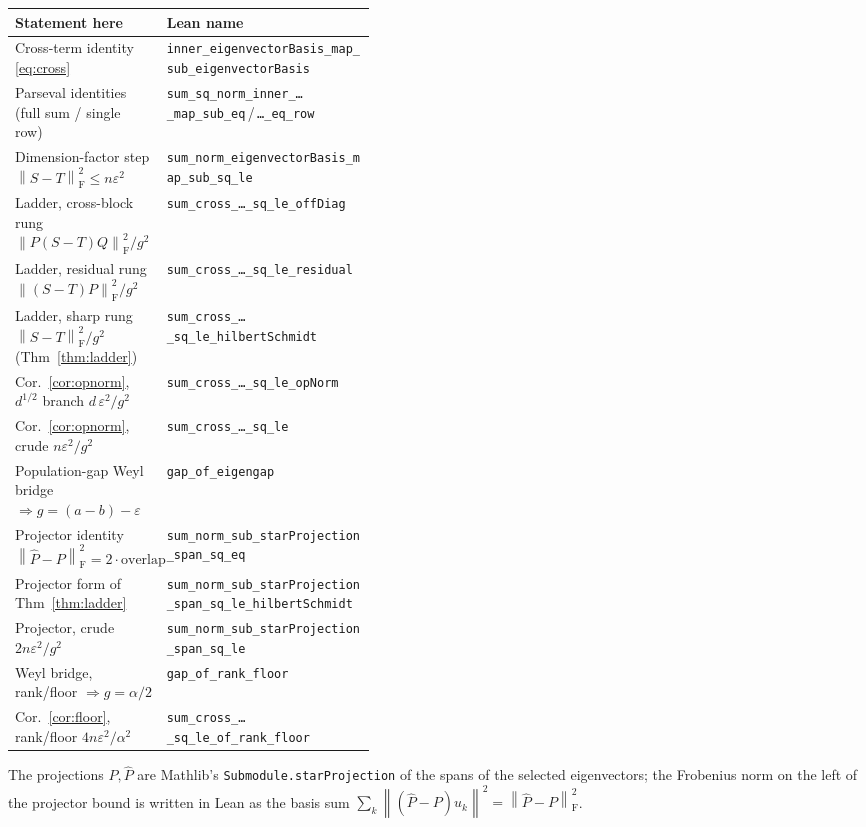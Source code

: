 \documentclass[11pt]{article}
\newcommand{\norm}[1]{\left\lVert #1\right\rVert}
\newcommand{\eps}{\varepsilon}
\newcommand{\F}{\mathrm{F}}
\newcommand{\gap}{g}
\theoremstyle{remark}
\begin{document}
\begin{center}
\footnotesize
\setlength{\tabcolsep}{4pt}
\begin{tabular}{@{}p{0.42\linewidth}l@{}}
\toprule
Statement here & Lean name \\
\midrule
Cross-term identity \eqref{eq:cross}
  & \texttt{inner\_eigenvectorBasis\_map\_sub\_eigenvectorBasis} \\
Parseval identities (full sum / single row)
  & \texttt{sum\_sq\_norm\_inner\_\dots\_map\_sub\_eq}\,/\,\texttt{\dots\_eq\_row} \\
Dimension-factor step $\norm{S-T}_{\F}^2\le n\eps^2$
  & \texttt{sum\_norm\_eigenvectorBasis\_map\_sub\_sq\_le} \\
Ladder, cross-block rung $\norm{P(S-T)Q}_{\F}^2/\gap^2$
  & \texttt{sum\_cross\_\dots\_sq\_le\_offDiag} \\
Ladder, residual rung $\norm{(S-T)P}_{\F}^2/\gap^2$
  & \texttt{sum\_cross\_\dots\_sq\_le\_residual} \\
Ladder, sharp rung $\norm{S-T}_{\F}^2/\gap^2$ (Thm~\ref{thm:ladder})
  & \texttt{sum\_cross\_\dots\_sq\_le\_hilbertSchmidt} \\
Cor.~\ref{cor:opnorm}, $d^{1/2}$ branch $d\,\eps^2/\gap^2$
  & \texttt{sum\_cross\_\dots\_sq\_le\_opNorm} \\
Cor.~\ref{cor:opnorm}, crude $n\eps^2/\gap^2$
  & \texttt{sum\_cross\_\dots\_sq\_le} \\
Population-gap Weyl bridge $\Rightarrow\gap=(a-b)-\eps$
  & \texttt{gap\_of\_eigengap} \\
Projector identity $\norm{\widehat P-P}_{\F}^2=2\cdot\text{overlap}$
  & \texttt{sum\_norm\_sub\_starProjection\_span\_sq\_eq} \\
Projector form of Thm~\ref{thm:ladder}
  & \texttt{sum\_norm\_sub\_starProjection\_span\_sq\_le\_hilbertSchmidt} \\
Projector, crude $2n\eps^2/\gap^2$
  & \texttt{sum\_norm\_sub\_starProjection\_span\_sq\_le} \\
Weyl bridge, rank/floor $\Rightarrow\gap=\alpha/2$
  & \texttt{gap\_of\_rank\_floor} \\
Cor.~\ref{cor:floor}, rank/floor $4n\eps^2/\alpha^2$
  & \texttt{sum\_cross\_\dots\_sq\_le\_of\_rank\_floor} \\
\bottomrule
\end{tabular}
\end{center}

The projections $P,\widehat P$ are Mathlib's \texttt{Submodule.starProjection}
of the spans of the selected eigenvectors; the Frobenius norm on the left of the
projector bound is written in Lean as the basis sum
$\sum_k\norm{(\widehat P-P)u_k}^2=\norm{\widehat P-P}_{\F}^2$.
\end{document}
